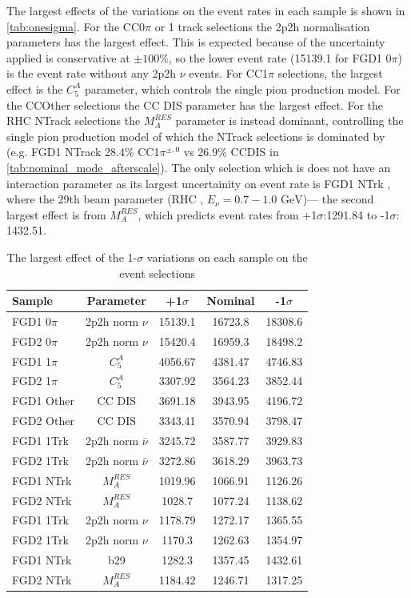 The largest effects of the variations on the event rates in each sample is shown in \autoref{tab:onesigma}. For the CC0$\pi$ or 1 track selections the 2p2h normalisation parameters has the largest effect. This is expected because of the uncertainty applied is conservative at $\pm100\%$, so the lower event rate (15139.1 for FGD1 0$\pi$) is the event rate without any 2p2h $\nu$ events. For CC1$\pi$ selections, the largest effect is the $C_5^A$ parameter, which controls the single pion production model. For the CCOther selections the CC DIS parameter has the largest effect. For the RHC NTrack selections the $M_A^{RES}$ parameter is instead dominant, controlling the single pion production model of which the NTrack selections is dominated by (e.g. FGD1 NTrack 28.4\% CC1$\pi^{\pm,0}$ vs 26.9\% CCDIS in \autoref{tab:nominal_mode_afterscale}). The only selection which is does not have an interaction parameter as its largest uncertainity on event rate is FGD1 NTrk \numu, where the 29th beam parameter (RHC \numubar, $E_\nu = 0.7-1.0 \text{ GeV}$)--- the second largest effect is from $M_A^{RES}$, which predicts event rates from +1$\sigma$:1291.84 to -1$\sigma$: 1432.51. 

\begin{table}[!h]
	\begin{tabular}{l | c | c c c }
		\hline
		\hline
		Sample & Parameter & +1$\sigma$ & Nominal & -1$\sigma$ \\
		\hline
		FGD1 0$\pi$ & 2p2h norm $\nu$ & 15139.1 & 16723.8 & 18308.6 \\
		FGD2 0$\pi$ & 2p2h norm $\nu$ & 15420.4 & 16959.3 & 18498.2 \\
		FGD1 1$\pi$ & $C^A_5$ & 4056.67 & 4381.47 & 4746.83 \\
		FGD2 1$\pi$ & $C^A_5$ & 3307.92 & 3564.23 & 3852.44 \\
		FGD1 Other & CC DIS & 3691.18 & 3943.95 & 4196.72 \\
		FGD2 Other & CC DIS & 3343.41 & 3570.94 & 3798.47 \\
		\hline
		FGD1 1Trk & 2p2h norm $\bar{\nu}$ & 3245.72 & 3587.77 & 3929.83 \\ 
		FGD2 1Trk & 2p2h norm $\bar{\nu}$ & 3272.86 & 3618.29 & 3963.73 \\
		FGD1 NTrk & $M_A^{RES}$ & 1019.96 & 1066.91 & 1126.26 \\
		FGD2 NTrk & $M_A^{RES}$ & 1028.7 & 1077.24 & 1138.62 \\
		
		\hline
		FGD1 1Trk \numu & 2p2h norm $\nu$ & 1178.79 & 1272.17 & 1365.55 \\
		FGD2 1Trk \numu & 2p2h norm $\nu$ & 1170.3 & 1262.63 & 1354.97 \\
		FGD1 NTrk \numu & b29 & 1282.3 & 1357.45 & 1432.61 \\
		FGD2 NTrk \numu & $M_A^{RES}$ & 1184.42 & 1246.71 & 1317.25 \\
		\hline
		\hline
	\end{tabular}
	\caption{The largest effect of the 1-$\sigma$ variations on each sample on the event selections}
	\label{tab:onesigma}
\end{table}

